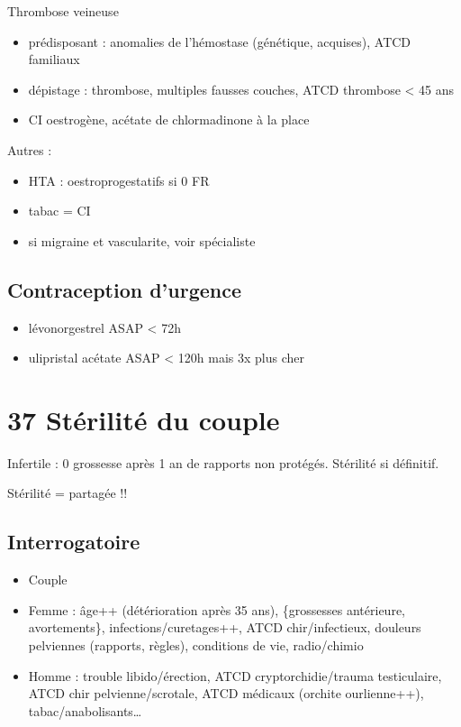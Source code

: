 \documentclass{book}
\begin{document}
Thrombose veineuse
\begin{itemize}
\item prédisposant : anomalies de l'hémostase (génétique, acquises), ATCD familiaux
\item dépistage : thrombose, multiples fausses couches, ATCD thrombose < 45 ans
\item CI oestrogène, acétate de chlormadinone à la place
\end{itemize}

Autres :
\begin{itemize}
\item HTA : oestroprogestatifs si 0 FR
\item tabac = CI
\item si migraine et vascularite, voir spécialiste
\end{itemize}

\subsection{Contraception d'urgence}
\label{sec:orgeca4d9c}
\begin{itemize}
\item lévonorgestrel ASAP < 72h
\item ulipristal acétate ASAP < 120h mais 3x plus cher
\end{itemize}

\section{37 \textdagger{} Stérilité du couple}
\label{sec:org0a47e10}
Infertile : 0 grossesse après 1 an de rapports non protégés. Stérilité si
définitif.

Stérilité = partagée !!

\subsection{Interrogatoire}
\label{sec:org23b51b8}
\begin{itemize}
\item Couple
\item Femme : âge++ (détérioration après 35 ans), \{grossesses antérieure,
avortements\}, infections/curetages++, ATCD chir/infectieux, douleurs
pelviennes (rapports, règles), conditions de vie, radio/chimio
\item Homme : trouble libido/érection, ATCD cryptorchidie/trauma testiculaire, ATCD
chir pelvienne/scrotale, ATCD médicaux (orchite ourlienne++), tabac/anabolisants\ldots{}
\end{itemize}
\end{document}

